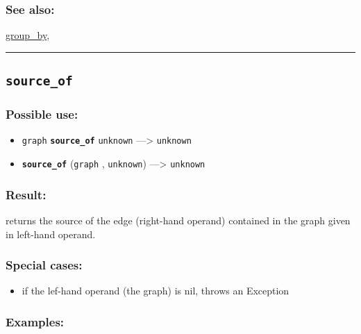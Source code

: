 \documentclass[]{book}
\providecommand{\tightlist}{%
  \setlength{\itemsep}{0pt}\setlength{\parskip}{0pt}}
\theoremstyle{definition}
\theoremstyle{definition}
\theoremstyle{definition}
\theoremstyle{remark}
\begin{document}
\subsubsection{See also:}\label{see-also-188}

\href{OperatorsDH\#group_by}{group\_by},

\begin{center}\rule{0.5\linewidth}{\linethickness}\end{center}

\subsection{\texorpdfstring{\texttt{source\_of}}{source\_of}}\label{source_of}

\subsubsection{Possible use:}\label{possible-use-487}

\begin{itemize}
\tightlist
\item
  \texttt{graph} \textbf{\texttt{source\_of}} \texttt{unknown}
  ---\textgreater{} \texttt{unknown}
\item
  \textbf{\texttt{source\_of}} (\texttt{graph} , \texttt{unknown})
  ---\textgreater{} \texttt{unknown}
\end{itemize}

\subsubsection{Result:}\label{result-471}

returns the source of the edge (right-hand operand) contained in the
graph given in left-hand operand.

\subsubsection{Special cases:}\label{special-cases-125}

\begin{itemize}
\tightlist
\item
  if the lef-hand operand (the graph) is nil, throws an Exception
\end{itemize}

\subsubsection{Examples:}\label{examples-340}
\end{document}
